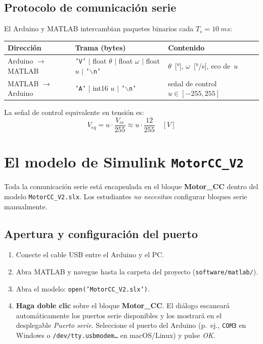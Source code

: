 \documentclass[12pt,a4paper]{article}
\begin{document}
\subsection{Protocolo de comunicación serie}

El Arduino y MATLAB intercambian paquetes binarios cada $T_s=\SI{10}{ms}$:

\begin{center}
\begin{tabular}{lll}
\toprule
\textbf{Dirección} & \textbf{Trama (bytes)} & \textbf{Contenido}\\
\midrule
Arduino $\to$ MATLAB & \texttt{'V'} $|$ float $\theta$ $|$ float $\omega$ $|$ float $u$ $|$ \texttt{'$\backslash$n'} &
  $\theta$~[°], $\omega$~[°/s], eco de~$u$\\
MATLAB $\to$ Arduino & \texttt{'A'} $|$ int16 $u$ $|$ \texttt{'$\backslash$n'} &
  señal de control $u\in[-255,255]$\\
\bottomrule
\end{tabular}
\end{center}

La señal de control equivalente en tensión es:
\begin{equation}
  V_{eq} = u \cdot \frac{V_{cc}}{255} \approx u \cdot \frac{12}{255} \quad [\si{V}]
\end{equation}

\section{El modelo de Simulink \texttt{MotorCC\_V2}}

Toda la comunicación serie está encapsulada en el bloque \textbf{Motor\_CC}
dentro del modelo \texttt{MotorCC\_V2.slx}. Los estudiantes \emph{no necesitan}
configurar bloques serie manualmente.

\subsection{Apertura y configuración del puerto}

\begin{enumerate}[noitemsep]
  \item Conecte el cable USB entre el Arduino y el PC.
  \item Abra MATLAB y navegue hasta la carpeta del proyecto
        (\texttt{software/matlab/}).
  \item Abra el modelo: \texttt{open('MotorCC\_V2.slx')}.
  \item \textbf{Haga doble clic} sobre el bloque \textbf{Motor\_CC}. El diálogo
        escaneará automáticamente los puertos serie disponibles y los mostrará
        en el desplegable \emph{Puerto serie}. Seleccione el puerto del Arduino
        (p.~ej., \texttt{COM3} en Windows o \texttt{/dev/tty.usbmodem…} en
        macOS/Linux) y pulse \emph{OK}.
\end{enumerate}
\end{document}
